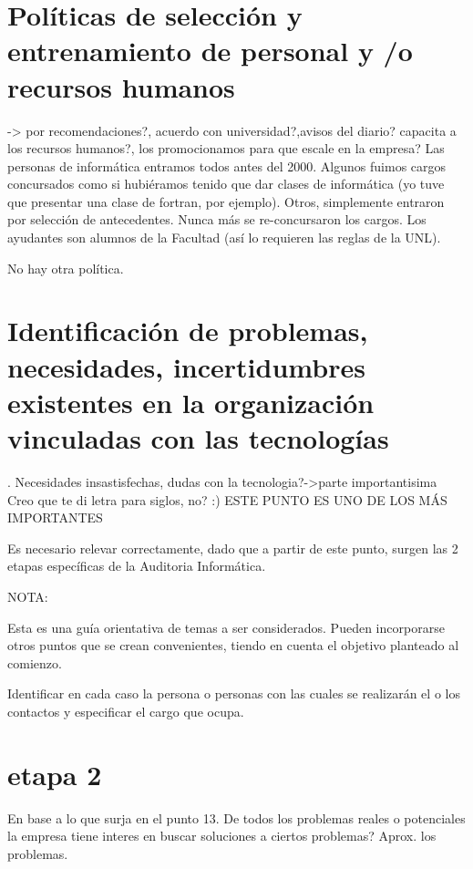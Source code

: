 \documentclass[10pt,a4paper,final]{article}
\begin{document}
\section{Políticas de selección y entrenamiento de personal y /o recursos humanos}
 -> por recomendaciones?, acuerdo con universidad?,avisos del diario? capacita a los recursos humanos?, los promocionamos para que escale en la empresa?
   Las personas de informática entramos todos antes del 2000. Algunos fuimos cargos concursados como si hubiéramos tenido que dar clases de informática (yo tuve que presentar una clase de fortran, por ejemplo). Otros, simplemente entraron por selección de antecedentes. Nunca más se re-concursaron los cargos. Los ayudantes son alumnos de la Facultad (así lo requieren las reglas de la UNL).

          No hay otra política. 
\section{Identificación de problemas, necesidades, incertidumbres existentes en la organización vinculadas con las tecnologías}. Necesidades insastisfechas, dudas con la tecnologia?->parte importantisima
 Creo que te di letra para siglos, no? :)
 ESTE PUNTO ES UNO DE LOS MÁS IMPORTANTES

Es necesario relevar correctamente, dado que a partir de este punto, surgen las 2 etapas específicas de la Auditoria Informática.

NOTA:

Esta es una guía orientativa de temas a ser considerados. Pueden incorporarse otros puntos que se crean convenientes, tiendo en cuenta el objetivo planteado al comienzo.

Identificar en cada caso la persona o personas con las cuales se realizarán el o los contactos y especificar el cargo que ocupa.

\section{etapa 2}
En base a lo que surja en el punto 13. De todos los problemas reales o potenciales la empresa tiene interes en buscar soluciones a ciertos problemas?
Aprox. los problemas.
\end{document}
